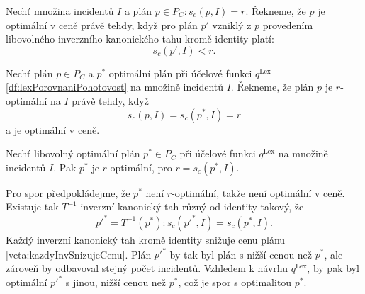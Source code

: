 \begin{definice}
  Nechť množina incidentů $I$ a plán $p \in P_C \colon s_c(p, I) = r$.
  Řekneme, že $p$ je optimální v ceně právě tehdy, když
  pro plán $p'$ vzniklý z $p$ provedením libovolného inverzního kanonického tahu kromě identity platí: 
  \begin{equation*}
    s_c(p', I) < r.
  \end{equation*}
\end{definice}

\begin{definice}\label{veta:planOptVCene}
  Nechť plán $p \in P_C$ a $p^*$ optimální plán při účelové funkci $q^{\text{Lex}}$ \ref{df:lexPorovnaniPohotovost} na množině incidentů $I$.
  Řekneme, že plán $p$ je $r$-optimální na $I$ právě tehdy, když 
  \begin{equation*}
    s_c(p, I) = s_c(p^*, I) = r
  \end{equation*}
  a je optimální v ceně.
\end{definice}

\begin{veta}\label{veta:optPlanOptVCene}
  Nechť libovolný optimální plán $p^* \in P_C$ při účelové funkci $q^{\text{Lex}}$ na množině incidentů $I$.
  Pak $p^*$ je $r$-optimální, pro $r = s_c(p^*, I)$.
\end{veta}
\begin{dukaz}
  Pro spor předpokládejme, že $p^*$ není $r$-optimální, takže není optimální v ceně.
  Existuje tak $T^{-1}$ inverzní kanonický tah různý od identity takový, že
  \begin{equation*}
    p'^* = T^{-1}(p^*) \colon s_c(p'^*, I) = s_c(p^*, I).
  \end{equation*}
  Každý inverzní kanonický tah kromě identity snižuje cenu plánu \ref{veta:kazdyInvSnizujeCenu}.
  Plán $p'^*$ by tak byl plán s nižší cenou než $p^*$, ale zároveň by odbavoval stejný počet incidentů.
  Vzhledem k návrhu $q^{\text{Lex}}$, by pak byl optimální $p'^*$ s jinou, nižší cenou než $p^*$, což je spor s optimalitou $p^*$.
\end{dukaz}


